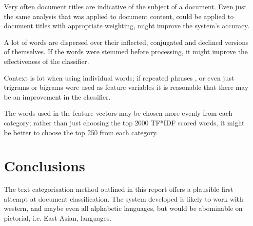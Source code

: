 \documentclass[11pt]{article}
\begin{document}
Very often document titles are indicative of the subject of a document. Even
just the same analysis that was applied to document content, could be applied
to document titles with appropriate weighting, might improve the system's
accuracy.

A lot of words are dispersed over their inflected, conjugated and declined
versions of themselves. If the words were stemmed before processing, it might
improve the effectiveness of the classifier.

Context is lot when using individual words; if repeated phrases , or even just
trigrams or bigrams were used as feature variables it is reasonable that there
may be an improvement in the classifier.

The words used in the feature vectors may be chosen more evenly from each
category; rather than just choosing the top 2000 TF*IDF scored words, it might
be better to choose the top 250 from each category.

\section{Conclusions}

The text categorisation method outlined in this report offers a plausible first
attempt at document classification. The system developed is likely to work with
western, and maybe even all alphabetic languages, but would be abominable on
pictorial, i.e. East Asian, languages.  



\end{document}
